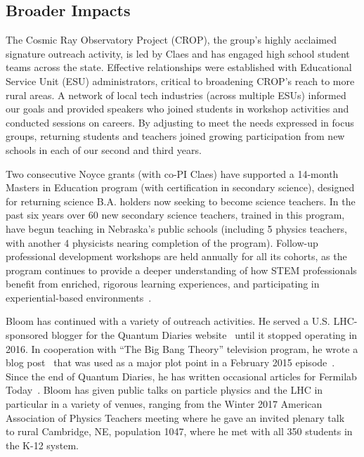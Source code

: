 \subsection{Broader Impacts}

The Cosmic Ray Observatory Project (CROP), the group's highly acclaimed signature outreach activity, is led by Claes and has engaged high school student teams across the state. Effective relationships were established with Educational Service Unit (ESU) administrators, critical to broadening CROP's reach to more rural areas. A network of local tech industries (across multiple ESUs) informed our goals and provided speakers who joined students in workshop activities and conducted sessions on careers. By adjusting to meet the needs expressed in focus groups, returning students and teachers joined growing participation from new schools in each of our second and third years.

Two consecutive Noyce grants (with co-PI Claes) have supported a 14-month Masters in Education program (with certification in secondary science), designed for returning science B.A. holders now seeking to become science teachers. In the past six years over 60 new secondary science teachers, trained in this program, have begun teaching in Nebraska's public schools (including 5 physics teachers, with another 4 physicists nearing completion of the program). Follow-up professional development workshops are held annually for all its cohorts, as the program continues to provide a deeper understanding of how STEM professionals benefit from enriched, rigorous learning experiences, and participating in experiential-based environments~\cite{bib:noyce}.

Bloom has continued with a variety of outreach activities.  He served a U.S. LHC-sponsored blogger for the Quantum Diaries website~\cite{bib:bloomblog} until it stopped operating in 2016.  In cooperation with ``The Big Bang Theory'' television program, he wrote a blog post~\cite{bib:TBBTQD} that was used as a major plot point in a February 2015 episode~\cite{bib:TBBTepisode}.  Since the end of Quantum Diaries, he has written occasional articles for Fermilab Today~\cite{bib:BloomFNALToday}.  Bloom has given public talks on particle physics and the LHC in particular in a variety of venues, ranging from  the Winter 2017 American Association of Physics Teachers meeting where he gave an invited plenary talk~\cite{bib:BloomAAPT} to rural Cambridge, NE, population 1047, where he met with all 350 students in the K-12 system.

